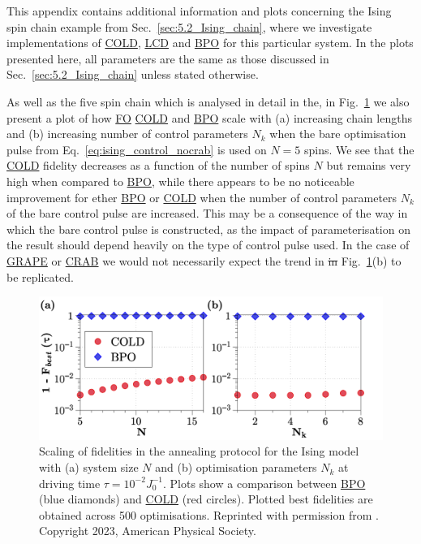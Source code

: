 \documentclass[a4paper,oneside,11pt]{book}
\newcommand{\acrref}[1]{\hyperref[acr:#1]{#1}}
\providecommand{\DIFdeltex}[1]{{\protect\color{red}\sout{#1}}}                      %
\providecommand{\DIFdelbegin}{} %
\providecommand{\DIFdelend}{} %
\providecommand{\DIFdel}[1]{\texorpdfstring{\DIFdeltex{#1}}{}} %
\newcommand{\DIFscaledelfig}{0.5}
\newlength{\DIFdelgraphicswidth} %
\newlength{\DIFdelgraphicsheight} %
\newcommand{\DIFdelincludegraphics}[2][]{%
\sbox{\DIFdelgraphicsbox}{\DIFOincludegraphics[#1]{#2}}%
\settoboxwidth{\DIFdelgraphicswidth}{\DIFdelgraphicsbox} %
\settoboxtotalheight{\DIFdelgraphicsheight}{\DIFdelgraphicsbox} %
\scalebox{\DIFscaledelfig}{%
\parbox[b]{\DIFdelgraphicswidth}{\usebox{\DIFdelgraphicsbox}\\[-\baselineskip] \rule{\DIFdelgraphicswidth}{0em}}\llap{\resizebox{\DIFdelgraphicswidth}{\DIFdelgraphicsheight}{%
\setlength{\unitlength}{\DIFdelgraphicswidth}%
\begin{picture}(1,1)%
\thicklines\linethickness{2pt} %
{\color[rgb]{1,0,0}\put(0,0){\framebox(1,1){}}}%
{\color[rgb]{1,0,0}\put(0,0){\line( 1,1){1}}}%
{\color[rgb]{1,0,0}\put(0,1){\line(1,-1){1}}}%
\end{picture}%
}\hspace*{3pt}}} %
} %
\DeclareRobustCommand{\DIFdelbegin}{\DIFOdelbegin \let\includegraphics\DIFdelincludegraphics} %
\DeclareRobustCommand{\DIFdelend}{\DIFOaddend \let\includegraphics\DIFOincludegraphics} %
\begin{document}
This appendix contains additional information and plots concerning the Ising spin chain example from Sec.~\ref{sec:5.2_Ising_chain}, where we investigate implementations of \acrref{COLD}, \acrref{LCD} and \acrref{BPO} for this particular system. In the plots presented here, all parameters are the same as those discussed in Sec.~\ref{sec:5.2_Ising_chain} unless stated otherwise.

As well as the five spin chain which is analysed in detail in the, in Fig.~\ref{fig:ising_scalingN} we also present a plot of how \acrref{FO} \acrref{COLD} and \acrref{BPO} scale with (a) increasing chain lengths and (b) increasing number of control parameters $N_k$ when the bare optimisation pulse from Eq.~\eqref{eq:ising_control_nocrab} is used on $N=5$ spins. We see that the \acrref{COLD} fidelity decreases as a function of the number of spins $N$ but remains very high when compared to \acrref{BPO}, while there appears to be no noticeable improvement for ether \acrref{BPO} or \acrref{COLD} when the number of control parameters $N_k$ of the bare control pulse are increased. This may be a consequence of the way in which the bare control pulse is constructed, as the impact of parameterisation on the result should depend heavily on the type of control pulse used. In the case of \acrref{GRAPE} or \acrref{CRAB} we would not necessarily expect the trend in \DIFdelbegin \DIFdel{in }\DIFdelend Fig.~\ref{fig:ising_scalingN}(b) to be replicated.

\begin{figure}[t!]
    \centering
    \includegraphics[width=\linewidth]{images/ScalingN.png} \caption[Plots of how final state fidelities scale using COLD and BPO for different system sizes and optimisable parameters.]{Scaling of fidelities in the annealing protocol for the Ising model with (a) system size $N$ and (b) optimisation parameters $N_k$ at driving time $\tau=10^{-2}J_0^{-1}$. Plots show a comparison between \acrref{BPO} (blue diamonds) and \acrref{COLD} (red circles). Plotted best fidelities are obtained across 500 optimisations. Reprinted with permission from \cite{cepaite_counterdiabatic_2023}. Copyright 2023, American Physical Society.}\label{fig:ising_scalingN}
\end{figure}
\end{document}
